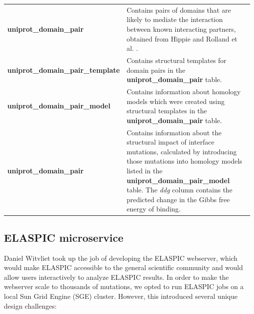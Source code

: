 \begin{table}[!tb]
\begin{tabular}{l | p{10cm}}
	\textbf{uniprot\_domain\_pair} & Contains pairs of domains that are likely to mediate the interaction between known interacting partners, obtained from Hippie \cite{schaefer_hippie:_2012} and Rolland et al. \cite{rolland_proteome-scale_2014}. \\
	\textbf{uniprot\_domain\_pair\_template} & Contains structural templates for domain pairs in the \textbf{uniprot\_domain\_pair} table. \\
	\textbf{uniprot\_domain\_pair\_model} & Contains information about homology models which were created using structural templates in the \textbf{uniprot\_domain\_pair} table. \\
	\textbf{uniprot\_domain\_pair} & Contains information about the structural impact of interface mutations, calculated by introducing those mutations into homology models listed in the \textbf{uniprot\_domain\_pair\_model} table. The \textit{ddg} column contains the predicted change in the Gibbs free energy of binding. \\
	\bottomrule
\end{tabular}
\end{table}



\subsection{ELASPIC microservice}

Daniel Witvliet took up the job of developing the ELASPIC webserver, which would make ELASPIC accessible to the general scientific community and would allow users interactively to analyze ELASPIC results. In order to make the webserver scale to thousands of mutations, we opted to run ELASPIC jobs on a local Sun Grid Engine (SGE) cluster. However, this introduced several unique design challenges:


